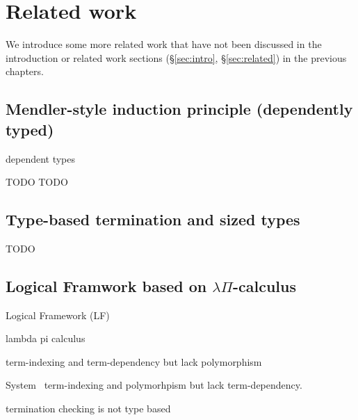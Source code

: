 \chapter{Related work}\label{ch:relwork}
We introduce some more related work that have not been discussed
in the introduction or related work sections (\S\ref{sec:intro},
\S\ref{sec:related}) in the previous chapters.



\section{Mendler-style induction principle (dependently typed)}
\label{sec:relwork:dep}
dependent types

TODO TODO

\section{Type-based termination and sized types}
TODO

\section{Logical Framwork based on $\lambda\Pi$-calculus}

Logical Framework (LF)

lambda pi calculus

term-indexing and term-dependency 
but lack polymorphism

System \Fi\
term-indexing and polymorhpism
but lack term-dependency.


termination checking is not type based


